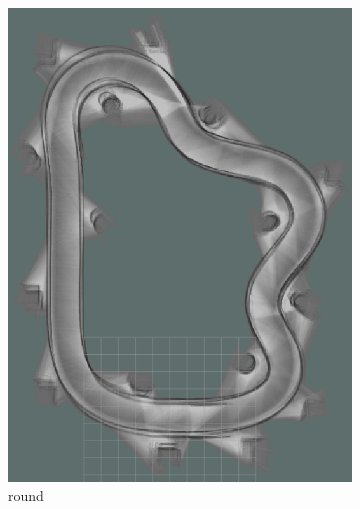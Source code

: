 \begin{figure}[H]
\begin{subfigure}{.3\linewidth}
		\includegraphics[width=\textwidth]{Pictures/2slamtest2}
		\caption{ round}
	\end{subfigure}
	\begin{subfigure}{.3\linewidth}

\end{subfigure}
\end{figure}
